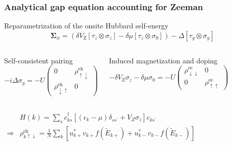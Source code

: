 \documentclass{beamer}
\begin{document}
\begin{frame}[noframenumbering]
\frametitle{Analytical gap equation accounting for Zeeman}

\begin{exampleblock}{Reparametrization of the onsite Hubbard self-energy}
\begin{equation*}
\boldsymbol{\Sigma}_{ii}=\left(\delta V_{\text{Z}}\left[\tau_{z}\otimes\sigma_{z}\right]-\delta\mu\left[\tau_{z}\otimes\sigma_{0}\right]\right)-\Delta\left[\tau_{y}\otimes\sigma_{y}\right]
\end{equation*}
\end{exampleblock}

\begin{columns}
\column{5cm}
\begin{alertblock}{Self-consistent pairing}
\vspace*{-4.5mm}
\begin{equation*}
-i\Delta\sigma_{y}=-U\left(\begin{array}{cc}
0 & \rho_{\uparrow\downarrow}^{\text{eh}}\\
\rho_{\downarrow\uparrow}^{\text{eh}} & 0
\end{array}\right)
\end{equation*}
\end{alertblock}

\column{6cm}
\begin{alertblock}{Induced magnetization and doping}
\vspace*{-4.5mm}
\begin{equation*}
-\delta V_{\text{Z}}\sigma_{z}-\delta\mu\sigma_{0}=-U\left(\begin{array}{cc}
\rho_{\downarrow\downarrow}^{\text{ee}} & 0\\
0 & \rho_{\uparrow\uparrow}^{\text{ee}}
\end{array}\right)
\end{equation*}
\end{alertblock}
\end{columns}
\pause

\begin{columns}
\column{1.5cm}
\column{9cm}
\begin{exampleblock}{}
\vspace*{-4.5mm}
\begin{align*}
&H(k)=\sum_{s}c_{ks}^{\dagger}\left[(\epsilon_{k}-\mu)\delta_{ss^{\prime}}+V_{Z}\sigma_{z}\right]c_{ks^{\prime}}\\\Rightarrow&\rho_{k\uparrow\downarrow}^{\text{eh}}=\frac{1}{N}\sum_{k}\left[u_{k+}^{*}v_{k+}f(\tilde{E}_{k+})+u_{k-}^{*}v_{k-}f(\tilde{E}_{k-})\right]
\end{align*}
\end{exampleblock}
\column{1.5cm}
\end{columns}


\end{frame}
\end{document}
